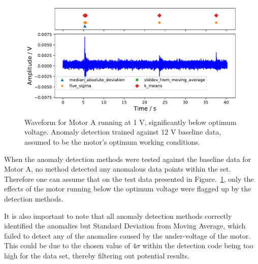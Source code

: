 
\begin{figure}[t]
    \includegraphics[width=1.0\textwidth]{fig/large_1V_nowater_large_12V.pdf}
    \caption[Undervoltage of Large Motor]{Waveform for Motor A running at 1 V, significantly below optimum voltage. Anomaly detection trained against 12 V baseline data, assumed to be the motor's optimum working conditions.}
    \label{fig:largemotor_1V}
\end{figure}

When the anomaly detection methods were tested against the baseline data for Motor A, no method detected any anomalous data points within the set. Therefore one can assume that on the test data presented in Figure.~\ref{fig:largemotor_1V}, only the effects of the motor running below the optimum voltage were flagged up by the detection methods. 

It is also important to note that all anomaly detection methods correctly identified the anomalies but Standard Deviation from Moving Average, which failed to detect any of the anomalies caused by the under-voltage of the motor. This could be due to the chosen value of $4\sigma$ within the detection code being too high for the data set, thereby filtering out potential results.

